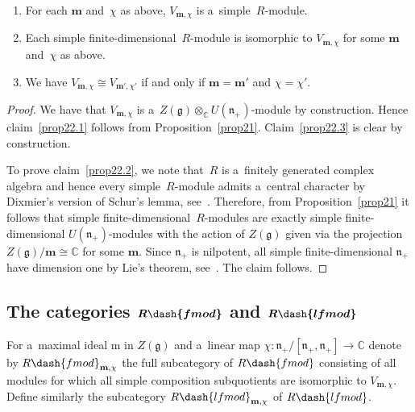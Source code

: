 \documentclass[pdftex]{sigma}
\begin{document}
{\samepage \begin{proposition}\qquad

\begin{enumerate}[$($i$)$]\itemsep=0pt
\item
\label{prop22.1}
For each $\mathbf{m}$ and~$\chi$ as above, $V_{\mathbf{m},\chi}$ is a~simple~$R$-module.
\item
\label{prop22.2}
Each simple finite-dimensional~$R$-module is isomorphic to $V_{\mathbf{m},\chi}$ for some $\mathbf{m}$ and~$\chi$ as
above.
\item
\label{prop22.3}
We have $V_{\mathbf{m},\chi}\cong V_{\mathbf{m}',\chi'}$ if and only if $\mathbf{m}=\mathbf{m}'$ and $\chi=\chi'$.
\end{enumerate}
\end{proposition}

}

\begin{proof}
We have that $V_{\mathbf{m},\chi}$ is a~$Z(\mathfrak{g})\otimes_{\mathbb{C}}U(\mathfrak{n}_+)$-module by construction.
Hence claim~\eqref{prop22.1} follows from Proposition~\ref{prop21}.
Claim~\eqref{prop22.3} is clear by construction.

To prove claim~\eqref{prop22.2}, we note that~$R$ is a~f\/initely generated complex algebra and hence every
simple~$R$-module admits a~central character by Dixmier's version of Schur's lemma, see~\cite[Proposition~2.6.8]{Di}.
Therefore, from Proposition~\ref{prop21} it follows that simple f\/inite-dimensional~$R$-modules are exactly simple f\/inite-dimensional $U(\mathfrak{n}_+)$-modules with the action of $Z(\mathfrak{g})$ given via the projection
$Z(\mathfrak{g})/\mathbf{m}\cong \mathbb{C}$ for some $\mathbf{m}$.
Since $\mathfrak{n}_+$ is nilpotent, all simple f\/inite-dimensional $\mathfrak{n}_+$ have dimension one by Lie's theorem,
see~\cite[Corollary~1.3.13]{Di}.
The claim follows.
\end{proof}

\subsection[The categories $R\dash{fmod}$ and $R\dash{lfmod}$]{The categories $\boldsymbol{R\dash{fmod}}$ and $\boldsymbol{R\dash{lfmod}}$}%

For a~maximal ideal $\mathrm{m}$ in $Z(\mathfrak{g})$ and a~linear map
$\chi:\mathfrak{n}_+/[\mathfrak{n}_+,\mathfrak{n}_+]\to\mathbb{C}$ denote by $R\dash{fmod}_{\mathbf{m},\chi}$ the full
subcategory of $R\dash{fmod}$ consisting of all modules for which all simple composition subquotients are isomorphic to
$V_{\mathbf{m},\chi}$.
Def\/ine similarly the subcategory $R\dash{lfmod}_{\mathbf{m},\chi}$ of $R\dash{lfmod}$.
\end{document}
